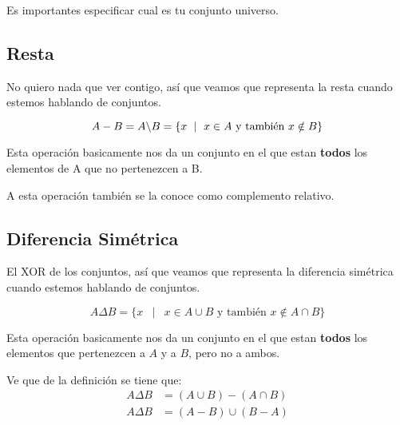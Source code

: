 \documentclass[12pt]{report}                                    %
\DeclareMathOperator \Space {\quad}                             %
\DeclareMathOperator \MiniSpace {\;}                            %
\newcommand \Such {\MiniSpace|\MiniSpace}                       %
\begin{document}
                Es importantes especificar cual es tu conjunto universo.


        \clearpage
        \subsection{Resta}

            No quiero nada que ver contigo, así que veamos que representa la resta cuando estemos
            hablando de conjuntos.

            \begin{equation}
                A - B = A \char`\\ B = \{ x \Such x \in A \text{ y también }  x \notin B \}
            \end{equation}

            Esta operación basicamente nos da un conjunto en el que estan \textbf{todos} los elementos
            de A que no pertenezcen a B.

            A esta operación también se la conoce como complemento relativo.



        \clearpage
        \subsection{Diferencia Simétrica}

            El XOR de los conjuntos, así que veamos que representa la diferencia simétrica cuando estemos
            hablando de conjuntos.

            \begin{equation}
                A \Delta B = \{ x \Such x \in A \cup B \text{ y también }  x \notin A \cap B \}
            \end{equation}

            Esta operación basicamente nos da un conjunto en el que estan \textbf{todos} los elementos
            que pertenezcen a $A$ y a $B$, pero no a ambos.

            Ve que de la definición se tiene que:
            \begin{equation*}
            \begin{split}
                A \Delta B &= (A \cup B) - ( A \cap B) \\
                A \Delta B &= (A - B) \cup ( B - A)
            \end{split}
            \end{equation*}
\end{document}
